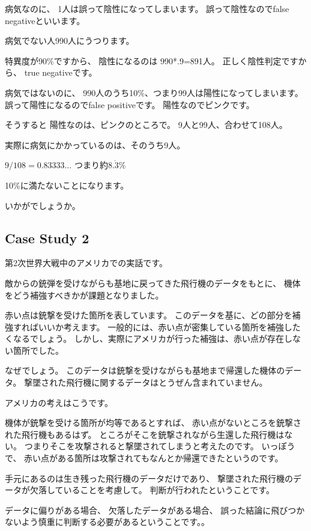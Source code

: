 \documentclass[uplatex,jis2004,dvipdfmx,12pt]{jsarticle}
\begin{document}
病気なのに、
1人は誤って陰性になってしまいます。
誤って陰性なのでfalse negativeといいます。

病気でない人990人にうつります。

特異度が90\%ですから、
陰性になるのは
990*.9=891人。
正しく陰性判定ですから、
true negativeです。

病気ではないのに、
990人のうち10\%、つまり99人は陽性になってしまいます。
誤って陽性になるのでfalse positiveです。
陽性なのでピンクです。

そうすると
陽性なのは、ピンクのところで。
9人と99人、合わせて108人。

実際に病気にかかっているのは、そのうち9人。

$9/108=0.83333\dots$
つまり約$8.\dot{3}\%$

10\%に満たないことになります。

いかがでしょうか。




\subsection{Case Study 2}

第2次世界大戦中のアメリカでの実話です。


敵からの銃弾を受けながらも基地に戻ってきた飛行機のデータをもとに、
機体をどう補強すべきかが課題となりました。

赤い点は銃撃を受けた箇所を表しています。
このデータを基に、どの部分を補強すればいいか考えます。
一般的には、赤い点が密集している箇所を補強したくなるでしょう。
しかし、実際にアメリカが行った補強は、赤い点が存在しない箇所でした。


なぜでしょう。
このデータは銃撃を受けながらも基地まで帰還した機体のデータ。
撃墜された飛行機に関するデータはとうぜん含まれていません。

アメリカの考えはこうです。

機体が銃撃を受ける箇所が均等であるとすれば、
赤い点がないところを銃撃された飛行機もあるはず。
ところがそこを銃撃されながら生還した飛行機はない。
つまりそこを攻撃されると撃墜されてしまうと考えたのです。
いっぽうで、
赤い点がある箇所は攻撃されてもなんとか帰還できたというのです。

手元にあるのは生き残った飛行機のデータだけであり、
撃墜された飛行機のデータが欠落していることを考慮して。
判断が行われたということです。

データに偏りがある場合、
欠落したデータがある場合、
誤った結論に飛びつかないよう慎重に判断する必要があるということです。。
\end{document}
